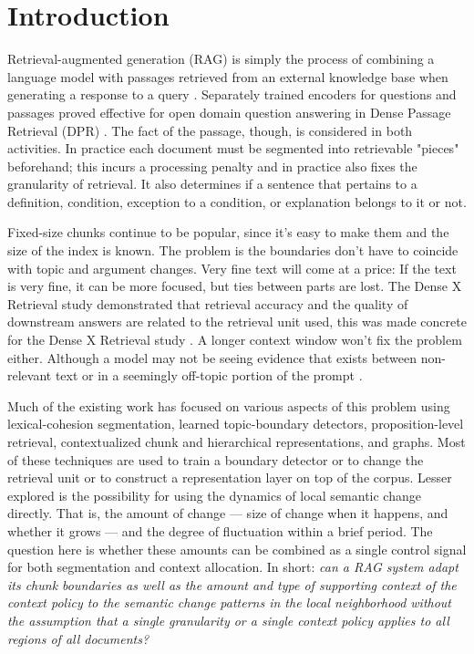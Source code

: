 \documentclass[10pt,a4paper]{article}
\begin{document}
\section{Introduction}

Retrieval-augmented generation (RAG) is simply the process of combining a language model with passages retrieved from an external knowledge base when generating a response to a query \cite{lewis2020rag}. Separately trained encoders for questions and passages proved effective for open domain question answering in Dense Passage Retrieval (DPR) \cite{karpukhin2020dpr}. The fact of the passage, though, is considered in both activities. In practice each document must be segmented into retrievable "pieces" beforehand; this incurs a processing penalty and in practice also fixes the granularity of retrieval. It also determines if a sentence that pertains to a definition, condition, exception to a condition, or explanation belongs to it or not.

Fixed-size chunks continue to be popular, since it's easy to make them and the size of the index is known. The problem is the boundaries don't have to coincide with topic and argument changes. Very fine text will come at a price: If the text is very fine, it can be more focused, but ties between parts are lost. The Dense X Retrieval study demonstrated that retrieval accuracy and the quality of downstream answers are related to the retrieval unit used, this was made concrete for the Dense X Retrieval study \cite{chen2024densex}. A longer context window won't fix the problem either. Although a model may not be seeing evidence that exists between non-relevant text or in a seemingly off-topic portion of the prompt \cite{liu2024lostmiddle}.

Much of the existing work has focused on various aspects of this problem using lexical-cohesion segmentation, learned topic-boundary detectors, proposition-level retrieval, contextualized chunk and hierarchical representations, and graphs. Most of these techniques are used to train a boundary detector or to change the retrieval unit or to construct a representation layer on top of the corpus. Lesser explored is the possibility for using the dynamics of local semantic change directly. That is, the amount of change — size of change when it happens, and whether it grows — and the degree of fluctuation within a brief period. The question here is whether these amounts can be combined as a single control signal for both segmentation and context allocation. In short: \emph{can a RAG system adapt its chunk boundaries as well as the amount and type of supporting context of the context policy to the semantic change patterns in the local neighborhood without the assumption that a single granularity or a single context policy applies to all regions of all documents?}
\end{document}
